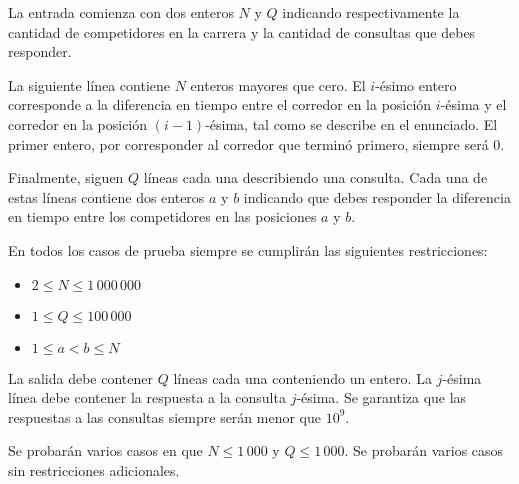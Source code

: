 \documentclass{oci}
\begin{document}
\begin{inputDescription}
  La entrada comienza con dos enteros $N$ y $Q$ indicando respectivamente la cantidad de
  competidores en la carrera y la cantidad de consultas que debes responder.

  La siguiente línea contiene $N$ enteros mayores que cero.
  El $i$-ésimo entero corresponde a la diferencia en tiempo entre el corredor en la posición
  $i$-ésima y el corredor en la posición $(i-1)$-ésima, tal como se describe en el enunciado.
  El primer entero, por corresponder al corredor que terminó primero, siempre será 0.
  
  Finalmente, siguen $Q$ líneas cada una describiendo una consulta.
  Cada una de estas líneas contiene dos enteros $a$ y $b$ indicando que debes
  responder la diferencia en tiempo entre los competidores en las posiciones $a$ y $b$.

  En todos los casos de prueba siempre se cumplirán las siguientes restricciones:
  \begin{itemize}
  \item $2 \leq N \leq 1\,000\,000$
  \item $1 \leq Q \leq 100\,000$
  \item $1 \leq a < b \leq N$
  \end{itemize}
\end{inputDescription}

\begin{outputDescription}
  La salida debe contener $Q$ líneas cada una conteniendo un entero.
  La $j$-ésima línea debe contener la respuesta a la consulta $j$-ésima.
  Se garantiza que las respuestas a las consultas siempre serán menor que $10^9$.
\end{outputDescription}

\begin{scoreDescription}
  Se probarán varios casos en que $N \leq 1\,000$ y $Q \leq 1\,000$.
  Se probarán varios casos sin restricciones adicionales.
\end{scoreDescription}

\begin{sampleDescription}
\end{sampleDescription}
\end{document}
